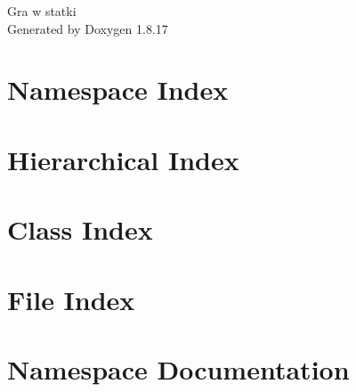 \let\mypdfximage\pdfximage\def\pdfximage{\immediate\mypdfximage}\documentclass[twoside]{book}
\newcommand{\+}{\discretionary{\mbox{\scriptsize$\hookleftarrow$}}{}{}}
\newcommand{\clearemptydoublepage}{%
  \newpage{\pagestyle{empty}\cleardoublepage}%
}
\begin{document}
\hypersetup{pageanchor=false,
             bookmarksnumbered=true,
             pdfencoding=unicode
            }
\begin{titlepage}
\vspace*{7cm}
\begin{center}%
{\Large Gra w statki }\\
\vspace*{1cm}
{\large Generated by Doxygen 1.8.17}\\
\end{center}
\end{titlepage}
\clearemptydoublepage
{}
\tableofcontents
\clearemptydoublepage
{}
\hypersetup{pageanchor=true}

\chapter{Namespace Index}

\chapter{Hierarchical Index}

\chapter{Class Index}

\chapter{File Index}

\chapter{Namespace Documentation}
















\end{document}
